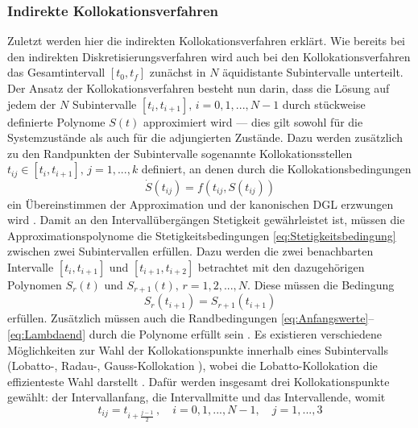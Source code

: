 \subsubsection{Indirekte Kollokationsverfahren}\label{subsubsec:Kollokationsverfahren_indirekt}
Zuletzt werden hier die indirekten Kollokationsverfahren erklärt. Wie bereits bei den indirekten Diskretisierungsverfahren wird auch bei den Kollokationsverfahren das Gesamtintervall $[t_0, t_f]$ zunächst in $N$ äquidistante Subintervalle unterteilt. Der Ansatz der Kollokationsverfahren besteht nun darin, dass die Lösung auf jedem der $N$ Subintervalle $[t_i, t_{i+1}],\, i = 0,1,...,N-1$ durch stückweise definierte Polynome $S(t)$ approximiert wird \cite{Gerdts.2010} --- dies gilt sowohl für die Systemzustände als auch für die adjungierten Zustände. Dazu werden zusätzlich zu den Randpunkten der Subintervalle sogenannte Kollokationsstellen $t_{ij} \in [t_i, t_{i+1}],\, j = 1,...,k$ definiert, an denen durch die Kollokationsbedingungen  
\begin{equation}
	\dot{S}(t_{ij}) = f(t_{ij},S(t_{ij})) \label{eq:Kollokationsbedingung}
\end{equation}
ein Übereinstimmen der Approximation und der kanonischen \gls{DGL} erzwungen wird \cite{Gerdts.2010}. Damit an den Intervallübergängen Stetigkeit gewährleistet ist, müssen die Approximationspolynome die Stetigkeitsbedingungen \eqref{eq:Stetigkeitsbedingung} zwischen zwei Subintervallen erfüllen. Dazu werden die zwei benachbarten Intervalle $[t_i, t_{i+1}]$ und $[t_{i+1}, t_{i+2}]$ betrachtet mit den dazugehörigen Polynomen $S_r(t)$ und $S_{r+1}(t),\, r = 1,2,...,N$. Diese müssen die Bedingung
\begin{equation}
S_r(t_{i+1}) = S_{r+1}(t_{i+1}) \label{eq:Stetigkeitsbedingung}
\end{equation} 
erfüllen. Zusätzlich müssen auch die Randbedingungen \eqref{eq:Anfangswerte}--\eqref{eq:Lambdaend} durch die Polynome erfüllt sein \cite{Gerdts.2010}. Es existieren verschiedene Möglichkeiten zur Wahl der Kollokationspunkte innerhalb eines Subintervalls (Lobatto-, Radau-, Gauss-Kollokation \cite{Weiss.1974}), wobei die Lobatto-Kollokation die effizienteste Wahl darstellt \cite{Weiss.1974}. Dafür werden insgesamt drei Kollokationspunkte gewählt: der Intervallanfang, die Intervallmitte und das Intervallende, womit 
\begin{equation}
	t_{ij} = t_{i+\frac{j-1}{2}}\,,\quad i = 0,1,...,N-1,\quad j = 1,...,3
\end{equation}
